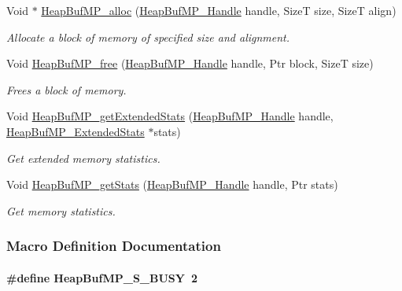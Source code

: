 \begin{DoxyCompactItemize}
Void $\ast$ \hyperlink{_heap_buf_m_p_8h_aab507dc414e09bbfe75ceb78458c27ed}{Heap\-Buf\-M\-P\-\_\-alloc} (\hyperlink{_heap_buf_m_p_8h_a0dc02cca2abd71fa48bfaf79c1c09ca3}{Heap\-Buf\-M\-P\-\_\-\-Handle} handle, Size\-T size, Size\-T align)
\begin{DoxyCompactList}\small\item\em Allocate a block of memory of specified size and alignment. \end{DoxyCompactList}\item 
Void \hyperlink{_heap_buf_m_p_8h_a667a26b92e70373b8642ff15e61ad7d0}{Heap\-Buf\-M\-P\-\_\-free} (\hyperlink{_heap_buf_m_p_8h_a0dc02cca2abd71fa48bfaf79c1c09ca3}{Heap\-Buf\-M\-P\-\_\-\-Handle} handle, Ptr block, Size\-T size)
\begin{DoxyCompactList}\small\item\em Frees a block of memory. \end{DoxyCompactList}\item 
Void \hyperlink{_heap_buf_m_p_8h_a339d8eb929f35742d2ff5b3b5381c57b}{Heap\-Buf\-M\-P\-\_\-get\-Extended\-Stats} (\hyperlink{_heap_buf_m_p_8h_a0dc02cca2abd71fa48bfaf79c1c09ca3}{Heap\-Buf\-M\-P\-\_\-\-Handle} handle, \hyperlink{struct_heap_buf_m_p___extended_stats}{Heap\-Buf\-M\-P\-\_\-\-Extended\-Stats} $\ast$stats)
\begin{DoxyCompactList}\small\item\em Get extended memory statistics. \end{DoxyCompactList}\item 
Void \hyperlink{_heap_buf_m_p_8h_aed941f6bb592ec1573c646f7c6a4290a}{Heap\-Buf\-M\-P\-\_\-get\-Stats} (\hyperlink{_heap_buf_m_p_8h_a0dc02cca2abd71fa48bfaf79c1c09ca3}{Heap\-Buf\-M\-P\-\_\-\-Handle} handle, Ptr stats)
\begin{DoxyCompactList}\small\item\em Get memory statistics. \end{DoxyCompactList}\end{DoxyCompactItemize}


\subsubsection{Macro Definition Documentation}
\paragraph[{Heap\-Buf\-M\-P\-\_\-\-S\-\_\-\-B\-U\-S\-Y}]{\setlength{\rightskip}{0pt plus 5cm}\#define Heap\-Buf\-M\-P\-\_\-\-S\-\_\-\-B\-U\-S\-Y~2}\label{_heap_buf_m_p_8h_ae1b0ea5865b0687653171ad2bf3d17b3}


